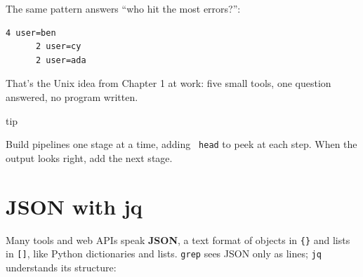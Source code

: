The same pattern answers ``who hit the most errors?'':

\begin{codeblock}

\begin{Shaded}
\begin{Highlighting}[]
\KeywordTok{|}  \StringTok{\textquotesingle{} \textquotesingle{}}  \KeywordTok{|}  \KeywordTok{|}   \KeywordTok{|}  
\end{Highlighting}
\end{Shaded}

\end{codeblock}

\begin{codeblock}
\begin{Verbatim}[formatcom=\outputstyle]
      4 user=ben
      2 user=cy
      2 user=ada
\end{Verbatim}
\end{codeblock}

That's the Unix idea from Chapter 1 at work: five small tools, one question answered, no program written.

\begin{callout}{tip}

Build pipelines one stage at a time, adding \texttt{\textbar{}\ head} to peek at each step. When the output looks right, add the next stage.

\end{callout}


\section{JSON with jq}\label{05-the-everyday-command-line:json-with-jq}

Many tools and web APIs speak \textbf{JSON}, a text format of objects in \texttt{\{\}} and lists in \texttt{{[}{]}}, like Python dictionaries and lists. \texttt{grep} sees JSON only as lines; \texttt{jq} understands its structure:

\begin{codeblock}

\begin{Shaded}
\begin{Highlighting}[]
  
 
\end{Highlighting}
\end{Shaded}

\end{codeblock}

